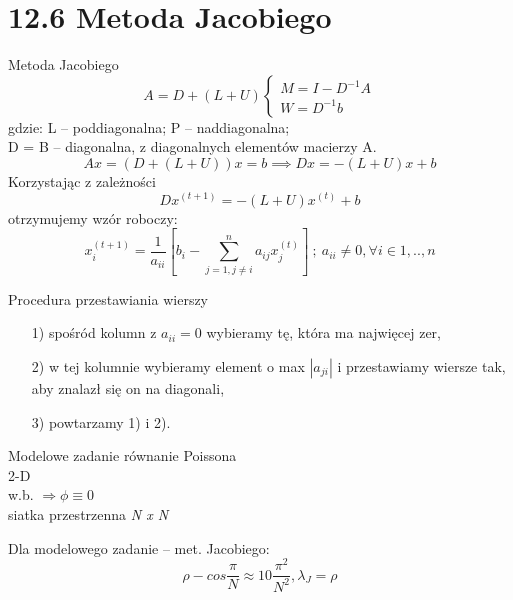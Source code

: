 \section{12.6 Metoda Jacobiego}

\begin{frame}{Metoda Jacobiego}
  $$
  A=D+(L+U)
  \begin{cases}
  M=I-D^{-1}A\\
  W=D^{-1}b
  \end{cases}
  $$
  gdzie: L -- poddiagonalna; P -- naddiagonalna;\\
  D = B -- diagonalna, z diagonalnych elementów macierzy A.
  $$Ax = (D+(L+U))x = b \implies Dx = -(L+U)x + b$$
  Korzystając z zależności
  $$\boxed{Dx^{(t+1)}= -(L+U)x^{(t)}+b}$$
  otrzymujemy wzór roboczy:
  $$x_i^{(t+1)}=\frac{1}{a_{ii}}[b_i-\sum_{j=1,j\neq i}^{n} a_{ij}x_j^{(t)}]\  ;\  a_{ii} \neq 0, \forall i \in {1,..,n} $$
\end{frame}

\begin{frame}
  \begin{block}{Procedura przestawiania wierszy}
    \begin{itemize}
      \item[1)] spośród kolumn z $a_{ii} = 0$ wybieramy tę, która ma najwięcej zer,
      \item[2)] w tej kolumnie wybieramy element o max $|a_{ji}|$ i przestawiamy wiersze tak, aby znalazł się on na diagonali,
      \item[3)] powtarzamy 1) i 2).
    \end{itemize}
  \end{block}
\end{frame}

\begin{frame}{}
  \begin{block}{Modelowe zadanie}
    równanie Poissona
    \\2-D
    \\w.b. $\Rightarrow\phi\equiv 0$
    \\siatka przestrzenna \emph{N x N}
  \end{block}

  \begin{block}{Dla modelowego zadanie -- met. Jacobiego:}
    $$\rho - cos\frac{\pi}{N}\approx 1 0 \frac{\pi^2}{N^2}, \lambda _J = \rho$$
  \end{block}
\end{frame}


